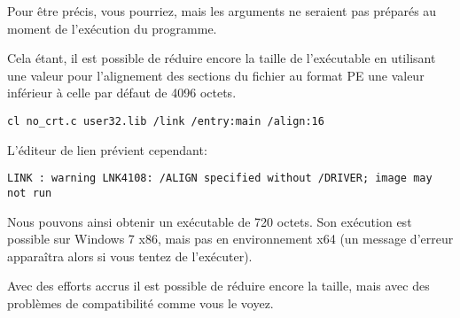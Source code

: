 Pour être précis, vous pourriez, mais les arguments ne seraient pas préparés au moment de
l'exécution du programme.

Cela étant, il est possible de réduire encore la taille de l'exécutable en utilisant une valeur
pour l'alignement des sections du fichier au format \ac{PE} une valeur inférieur à celle par
défaut de 4096 octets.

\begin{lstlisting}
cl no_crt.c user32.lib /link /entry:main /align:16
\end{lstlisting}

L'éditeur de lien prévient cependant:

\begin{lstlisting}
LINK : warning LNK4108: /ALIGN specified without /DRIVER; image may not run
\end{lstlisting}

Nous pouvons ainsi obtenir un exécutable de 720 octets.
Son exécution est possible sur Windows 7 x86, mais pas en environnement x64
(un message d'erreur apparaîtra alors si vous tentez de l'exécuter).

Avec des efforts accrus il est possible de réduire encore la taille, mais avec des problèmes de
compatibilité comme vous le voyez.
